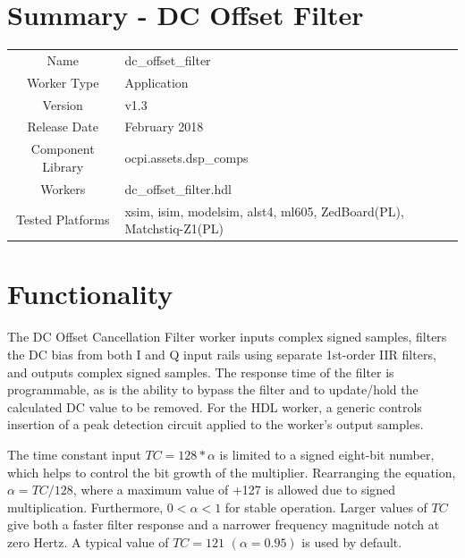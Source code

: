 \documentclass{article}
\author{} %
\date{Version \docVersion} %
\title{\docTitle}
\def\docVersion{1.3}
\def\comp{dc\_offset\_filter}
\def\Comp{DC Offset Filter}
\begin{document}
\section*{Summary - \Comp}
\begin{tabular}{|c|M{13.5cm}|}
	\hline
	                  &                                                    \\
	\hline
	Name              & \comp                                              \\
	\hline
	Worker Type       & Application                                        \\
	\hline
	Version           & v\docVersion \\
	\hline
	Release Date      & February 2018 \\
	\hline
	Component Library & ocpi.assets.dsp\_comps                              \\
	\hline
	Workers           & \comp.hdl                                          \\
	\hline
	Tested Platforms  & xsim, isim, modelsim, alst4, ml605, ZedBoard(PL), Matchstiq-Z1(PL) \\
	\hline
\end{tabular}

\section*{Functionality}
\begin{flushleft}
	The DC Offset Cancellation Filter worker inputs complex signed samples, filters the DC bias from both I and Q input rails using separate 1st-order IIR filters, and outputs complex signed samples. The response time of the filter is programmable, as is the ability to bypass the filter and to update/hold the calculated DC value to be removed. For the HDL worker, a generic controls insertion of a peak detection circuit applied to the worker's output samples.\medskip

	The time constant input $TC = 128*\alpha$ is limited to a signed eight-bit number, which helps to control the bit growth of the multiplier. Rearranging the equation, $\alpha = TC/128$, where a maximum value of +127 is allowed due to signed multiplication. Furthermore, $0<\alpha<1$ for stable operation. Larger values of $TC$ give both a faster filter response and a narrower frequency magnitude notch at zero Hertz. A typical value of $TC = 121$ $(\alpha = 0.95)$ is used by default.
\end{flushleft}
\end{document}
